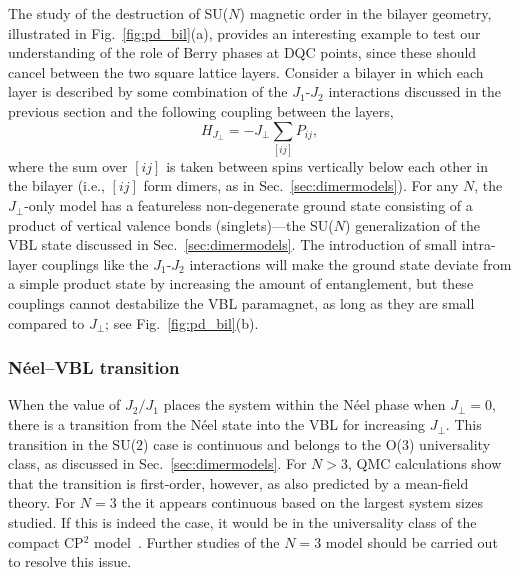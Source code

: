 \documentclass[range]{ar2e}
\begin{document}
The study of the destruction of SU($N$) magnetic order in the bilayer geometry, illustrated in Fig.~\ref{fig:pd_bil}(a), provides an interesting 
example to test our understanding of the role of Berry phases at DQC points, since these should cancel between the two square lattice layers. 
Consider a bilayer in which each layer is described by some combination of the $J_1$-$J_2$ interactions discussed in the previous section and the 
following coupling between the layers,
\begin{equation}
 H_{J_\perp} = -J_\perp \sum_{[ij]} P_{ij},
\end{equation}
where the sum over $[ij]$ is taken between spins vertically below each other in the bilayer (i.e., $[ij]$ form dimers, as in Sec.~\ref{sec:dimermodels}). For 
any $N$, the $J_\perp$-only model has a featureless non-degenerate ground state consisting of a product of vertical valence bonds (singlets)---the SU($N$)
generalization of the VBL state discussed in Sec.~\ref{sec:dimermodels}. The introduction of small intra-layer couplings like the $J_1$-$J_2$ interactions will 
make the ground state deviate from a simple product state by increasing the amount of entanglement, but these couplings cannot destabilize the VBL paramagnet,
as long as they are small compared to $J_\perp$; see Fig.~\ref{fig:pd_bil}(b). 

\subsubsection{N\'eel--VBL transition}

When the value of $J_2/J_1$ places the system within the N\'eel phase when $J_\perp=0$, there is a transition from the N\'eel state into the VBL for increasing 
$J_\perp$. This transition in the SU($2$) case is continuous and belongs to the O($3$) universality class, as discussed in Sec.~\ref{sec:dimermodels}. For $N>3$, 
QMC calculations \cite{kaul2012:sun_bil} show that the transition is first-order, however, as also predicted by a mean-field theory. For $N=3$ the it appears 
continuous based on the largest system sizes studied. If this is indeed the case, it would be in the universality class of the compact CP$^2$ model~\cite{nahum2011:loops}. 
Further studies of the $N=3$ model should be carried out to resolve this issue.
\end{document}
